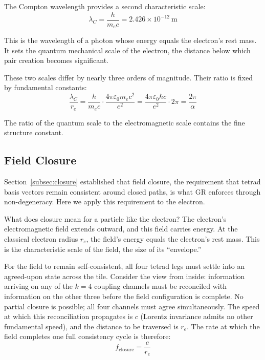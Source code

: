 \documentclass[aps,prd,preprint,superscriptaddress,showpacs,preprintnumbers,amsmath,amssymb,nofootinbib]{revtex4-2}
\begin{document}
The Compton wavelength provides a second characteristic scale:
\begin{equation}
\lambda_C = \frac{h}{m_e c} = 2.426 \times 10^{-12}~\text{m}
\end{equation}

This is the wavelength of a photon whose energy equals the electron's rest mass. It sets the quantum mechanical scale of the electron, the distance below which pair creation becomes significant.

These two scales differ by nearly three orders of magnitude. Their ratio is fixed by fundamental constants:
\begin{equation}
\frac{\lambda_C}{r_e} = \frac{h}{m_e c} \cdot \frac{4\pi\varepsilon_0 m_e c^2}{e^2} = \frac{4\pi\varepsilon_0 \hbar c}{e^2} \cdot 2\pi = \frac{2\pi}{\alpha}
\end{equation}

The ratio of the quantum scale to the electromagnetic scale contains the fine structure constant.

\subsection{Field Closure}
\label{subsec:rates}

Section~\ref{subsec:closure} established that field closure, the requirement that tetrad basis vectors remain consistent around closed paths, is what GR enforces through non-degeneracy. Here we apply this requirement to the electron.

What does closure mean for a particle like the electron? The electron's electromagnetic field extends outward, and this field carries energy. At the classical electron radius $r_e$, the field's energy equals the electron's rest mass. This is the characteristic scale of the field, the size of its ``envelope.''

For the field to remain self-consistent, all four tetrad legs must settle into an agreed-upon state across the tile. Consider the view from inside: information arriving on any of the $k = 4$ coupling channels must be reconciled with information on the other three before the field configuration is complete. No partial closure is possible; all four channels must agree simultaneously. The speed at which this reconciliation propagates is $c$ (Lorentz invariance admits no other fundamental speed), and the distance to be traversed is $r_e$. The rate at which the field completes one full consistency cycle is therefore:
\begin{equation}
f_{\text{closure}} = \frac{c}{r_e}
\end{equation}
\end{document}
